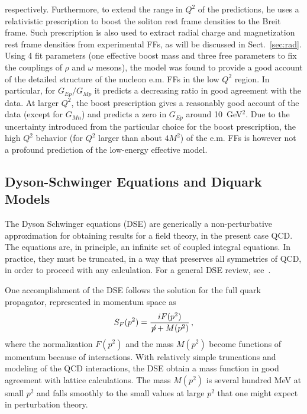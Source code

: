 respectively. Furthermore, to extend the range in $Q^2$ of the predictions, 
he uses a relativistic prescription to boost the soliton rest frame densities 
to the Breit frame. Such prescription is also used to extract 
radial charge and magnetization rest frame densities 
from experimental FFs, as will be discussed in Sect.~\ref{sec:rad}. 
Using 4 fit parameters (one effective boost mass and three free parameters 
to fix the couplings of $\rho$ and $\omega$ mesons), 
the model was found to provide a good account of 
the detailed structure of the nucleon e.m. FFs in the low $Q^2$ region. 
In particular, for $G_{Ep}/G_{Mp}$ it 
predicts a decreasing ratio in good agreement with the data. 
At larger $Q^2$, the boost prescription gives a reasonably good account of the 
data (except for $G_{Mn}$) and predicts a zero in $G_{Ep}$ around 
10~GeV$^2$. Due to the uncertainty introduced from 
the particular choice for the boost prescription, the 
high $Q^2$ behavior (for $Q^2$ larger than about $4 M^2$) 
of the e.m. FFs is however not a profound prediction of the 
low-energy effective model.  


\subsection{Dyson-Schwinger Equations and Diquark Models}
\label{subsec:dse}


The Dyson Schwinger equations (DSE) are generically a non-perturbative approximation for obtaining results for a field theory, in the present case QCD.  The equations are, in principle, an infinite set of coupled integral equations.  In practice, they must be truncated, in a way that preserves all symmetries of QCD, in order to proceed with any calculation. For a general DSE review, see~\cite{Bashir:2012fs}.   

One accomplishment of the DSE follows the solution for the full quark propagator, represented in momentum space as
\begin{equation}
S_F(p^2) = \frac{ i F(p^2) }{ \not\! p + M(p^2) }	\,,
\end{equation}
where the normalization $F(p^2)$ and the mass $M(p^2)$ become functions of momentum because of interactions.  With relatively simple truncations and modeling of the QCD interactions, the DSE obtain a mass function in good agreement with lattice calculations.  The mass $M(p^2)$ is several hundred MeV at small $p^2$ and falls smoothly to the small values at large $p^2$ that one might expect in perturbation theory.

